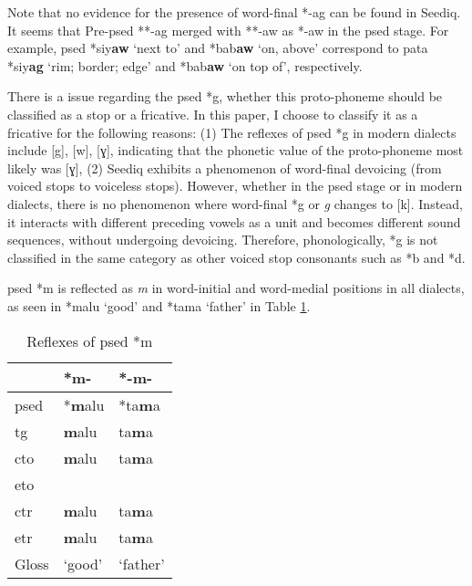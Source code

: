 Note that no evidence for the presence of word-final *-ag can be found in Seediq. It seems that Pre-\acl{psed} **-ag merged with **-aw as *-aw in the \acl{psed} stage. For example, \acl{psed} *siy\textbf{aw} `next to' and *bab\textbf{aw} `on, above' correspond to \acl{pata} *siy\textbf{ag} `rim; border; edge' and *bab\textbf{aw} `on top of', respectively.

There is a issue regarding the \acl{psed} *g, whether this proto-phoneme should be classified as a stop or a fricative. In this paper, I choose to classify it as a fricative for the following reasons: (1) The reflexes of \acl{psed} *g in modern dialects include [g], [w], [ɣ], indicating that the phonetic value of the proto-phoneme most likely was [ɣ], (2) Seediq exhibits a phenomenon of word-final devoicing (from voiced stops to voiceless stops). However, whether in the \acl{psed} stage or in modern dialects, there is no phenomenon where word-final *g or \textit{g} changes to [k]. Instead, it interacts with different preceding vowels as a unit and becomes different sound sequences, without undergoing devoicing. Therefore, phonologically, *g is not classified in the same category as other voiced stop consonants such as *b and *d.


\acl{psed} *m is reflected as \textit{m} in word-initial and word-medial positions in all dialects, as seen in *malu `good' and *tama `father' in Table \ref{tab:psed_m}.

\begin{table}[!htbp]
\centering
\caption{Reflexes of \acl{psed} *m}
\label{tab:psed_m}
\begin{tabular}{lll}
\hline
           & *m-    & *-m-     \\ \hline
\acs{psed} & *\textbf{m}alu  & *ta\textbf{m}a    \\ \hdashline
\acs{tg}   & \textbf{m}alu   & ta\textbf{m}a     \\
\acs{cto}  & \textbf{m}alu   & ta\textbf{m}a     \\
\acs{eto}  &        &          \\
\acs{ctr}  & \textbf{m}alu   & ta\textbf{m}a     \\
\acs{etr}  & \textbf{m}alu   & ta\textbf{m}a     \\ \hline
Gloss      & `good' & `father' \\ \hline
\end{tabular}
\end{table}


